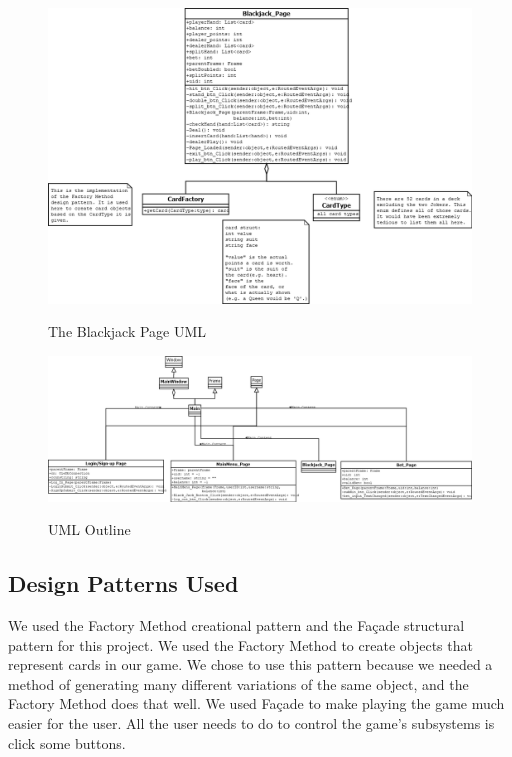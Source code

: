 \documentclass[10pt,conference,onecolumn,compsoc]{IEEEtran}
\begin{document}
\begin{figure}[h]
\caption{The Blackjack Page UML}
\centering
\includegraphics[scale=0.45]{Blackjack_UML}
\label{fig:outline1}
\centering
\end{figure}

\begin{figure}[h]
\caption{UML Outline}
\centering
\includegraphics[scale=0.33]{whole}
\label{fig:outline1}
\centering
\end{figure}



\subsection{Design Patterns Used}
We used the Factory Method creational pattern and the Façade structural pattern for this project. We used the Factory Method to create objects that represent cards in our game. We chose to use this pattern because we needed a method of generating many different variations of the same object, and the Factory Method does that well. We used Façade to make playing the game much easier for the user. All the user needs to do  to control the game's subsystems is click some buttons.
\end{document}
